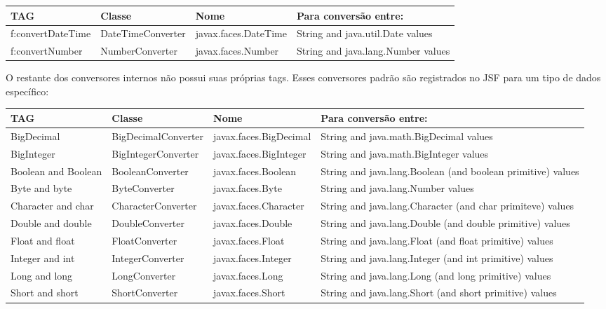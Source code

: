 \documentclass[	DIV=calc,%
							paper=a4,%
							fontsize=12pt,%
							onecolumn]{scrartcl}	 					%
\begin{document}
\begin{center}
\begin{tabular}{ | p{3cm} | p{3.7cm} | p{3.7cm} | p{5cm} |}
\hline
\textbf{ TAG} & \textbf{ Classe} & \textbf{Nome} & \textbf{Para conversão entre:} \\ \hline
f:convertDateTime & DateTimeConverter & javax.faces.DateTime & String and java.util.Date values\\ \hline
f:convertNumber & NumberConverter & javax.faces.Number & String and java.lang.Number values\\ \hline
\end{tabular}
\end{center}


O restante dos conversores internos não possui suas próprias tags. Esses conversores padrão são registrados no JSF para um tipo de dados específico:

\begin{center}
\begin{tabular}{ | p{3.2cm} | p{3.7cm} | p{4cm} | p{5cm} |}
\hline
\textbf{ TAG} & \textbf{ Classe} & \textbf{Nome} & \textbf{Para conversão entre:} \\ \hline
BigDecimal & BigDecimalConverter & javax.faces.BigDecimal & String and java.math.BigDecimal values\\ \hline
BigInteger & BigIntegerConverter & javax.faces.BigInteger & String and java.math.BigInteger values\\ \hline
Boolean and Boolean & BooleanConverter & javax.faces.Boolean & String and java.lang.Boolean (and boolean primitive) values\\ \hline
Byte and byte & ByteConverter & javax.faces.Byte & String and java.lang.Number values\\ \hline
Character and char & CharacterConverter & javax.faces.Character & String and java.lang.Character (and char primiteve) values\\ \hline
Double and double & DoubleConverter & javax.faces.Double & String and java.lang.Double (and double primitive) values\\ \hline
Float and float & FloatConverter & javax.faces.Float & String and java.lang.Float (and float primitive) values\\ \hline
Integer and int & IntegerConverter & javax.faces.Integer & String and java.lang.Integer (and int primitive) values\\ \hline
Long and long & LongConverter & javax.faces.Long & String and java.lang.Long (and long primitive) values\\ \hline
Short and short & ShortConverter & javax.faces.Short & String and java.lang.Short (and short primitive) values\\ \hline
\end{tabular}
\end{center}
\end{document}
